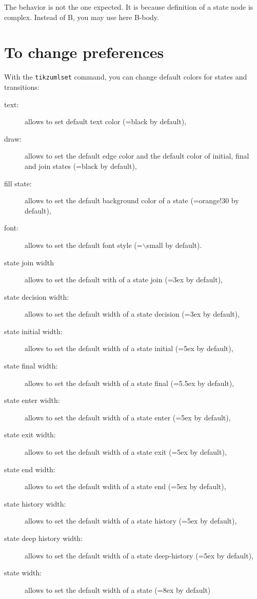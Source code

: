 \documentclass[a4paper,11pt]{report}
\begin{document}
\medskip

The behavior is not the one expected. It is because definition of a state node is complex. Instead of B, you may use here B-body.

\begin{minipage}{0.5\textwidth}
	
\end{minipage}
\begin{minipage}{0.5\textwidth}
	\begin{center}
	\end{center}
\end{minipage}

\medskip

\section{To change preferences}\label{s.fitstatetrans}

With the {\tt tikzumlset} command, you can change default colors for states and transitions:

\begin{description}
	\item[text:] allows to set default text color (=black by default),
	\item[draw:] allows to set the default edge color and the default color of initial, final and join states (=black by default),
	\item[fill state:] allows to set the default background color of a state (=orange!30 by default),
	\item[font:] allows to set the default font style (=$\backslash$small by default).
	\item[state join width] allows to set the default with of a state join (=3ex by default),
	\item[state decision width:] allows to set the default width of a state decision (=3ex by default),
	\item[state initial width:] allows to set the default width of a state initial (=5ex by default),
	\item[state final width:] allows to set the default width of a state final (=5.5ex by default),
	\item[state enter width:] allows to set the default width of a state enter (=5ex by default),
	\item[state exit width:] allows to set the default width of a state exit (=5ex by default),
	\item[state end width:] allows to set the default wdith of a state end (=5ex by default),
	\item[state history width:] allows to set the default width of a state history (=5ex by default),
	\item[state deep history width:] allows to set the default width of a state deep-history (=5ex by default),
	\item[state width:] allows to set the default width of a state (=8ex by default)
\end{description}
\end{document}
